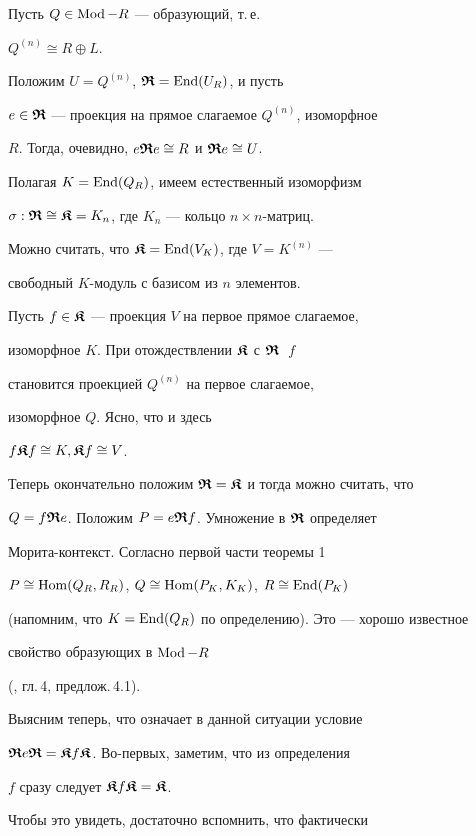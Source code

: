  


\begin{exam} Пусть $Q \in \operatorname{Mod}-R $ --- образующий, т.\,е.


$Q^{(n)} \cong R \oplus L$.


Положим $U=Q^{(n)}$, $\boldsymbol{\frak R}=\operatorname{End}(U_R) $, и пусть


$e \in \boldsymbol{\frak R}$ --- проекция на прямое слагаемое $Q^{(n)}$, изоморфное


$R$. Тогда, очевидно, $e \boldsymbol{\frak R} e \cong R $ и $\boldsymbol{\frak R} e \cong U $.


Полагая $K= \operatorname{End}(Q_R) $, имеем естественный изоморфизм


$\sigma: \boldsymbol{\frak R} \cong \boldsymbol{\frak K}=K_n $, где $ K_n$ --- кольцо $n\times n$-матриц.


Можно считать, что $\boldsymbol{\frak K}=\operatorname{End}(V_K)$, где $V=K^{(n)} $ ---


свободный $K$-модуль с базисом из $n$ элементов.


Пусть $f \in \boldsymbol{\frak K}$ --- проекция $V$ на первое прямое слагаемое,


изоморфное $K$. При отождествлении $\boldsymbol{\frak K}$ с $\boldsymbol{\frak R}\;$ $f$


становится проекцией $Q^{(n)}$ на первое слагаемое,


изоморфное $Q$. Ясно, что и здесь


$f \boldsymbol{\frak K} f \cong K,\boldsymbol{\frak K} f \cong V $.


Теперь окончательно положим $\boldsymbol{\frak R} = \boldsymbol{\frak K}$ и тогда можно считать, что


$Q=f \boldsymbol{\frak R} e$. Положим $P= e \boldsymbol{\frak R} f$. Умножение в $\boldsymbol{\frak R}$ определяет


Морита-контекст. Согласно первой части теоремы 1


$P \cong \operatorname{Hom}(Q_R,R_R)$, $Q \cong \operatorname{Hom}(P_K,K_K)$, $R \cong \operatorname{End}(P_K)$


(напомним, что $K=\operatorname{End}(Q_R)$ по определению). Это --- хорошо известное


свойство образующих в $\operatorname{Mod}-R$


(\cite{Faith}, гл.\,4, предлож.\,4.1).


\end{exam}





Выясним теперь, что означает в данной ситуации условие


$\boldsymbol{\frak R} e \boldsymbol{\frak R} = \boldsymbol{\frak K} f \boldsymbol{\frak K} $. Во-первых, заметим, что из определения


$f$ сразу следует $\boldsymbol{\frak K} f \boldsymbol{\frak K} = \boldsymbol{\frak K}$.


Чтобы это увидеть, достаточно вспомнить, что фактически


